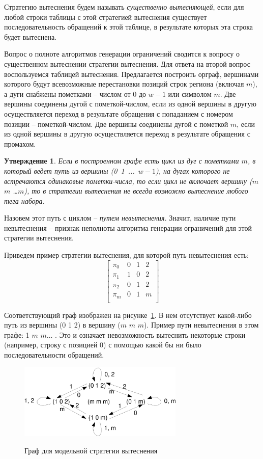 \documentclass[14pt]{extreport}
\newtheorem{utv}{Утверждение}
\begin{document}
Стратегию вытеснения будем называть \emph{существенно вытесняющей}, если для любой строки таблицы с этой стратегией вытеснения существует последовательность обращений к 
этой таблице, в результате которых эта строка будет вытеснена. 

Вопрос о полноте алгоритмов генерации ограничений сводится к вопросу о существенном вытеснении стратегии вытеснения. Для ответа на второй вопрос воспользуемся таблицей вытеснения. Предлагается построить орграф, вершинами которого будут всевозможные перестановки позиций строк региона (включая $m$), а дуги снабжены пометками -- числом от 0 до $w{-}1$ или символом
$m$. Две вершины соединены дугой с пометкой-числом, если из одной
вершины в другую осуществляется переход в результате обращения с попаданием с
номером позиции -- пометкой-числом. Две вершины соединены дугой с пометкой $m$,
если из одной вершины в другую осуществляется переход в результате обращения с промахом.

\begin{utv}
Если в построенном графе есть цикл из дуг с пометками $m$, в который
ведет путь из вершины (0~1~...~$w{-}1$), на дугах которого не
встречаются одинаковые пометки-числа, то если цикл не включает
вершину ($m$ $m$ \dots $m$), то в стратегии вытеснения не всегда
возможно вытеснение любого тега набора.
\end{utv}

Назовем этот путь с циклом -- \emph{путем невытеснения}. Значит, наличие
пути невытеснения -- признак неполноты алгоритма генерации ограничений для этой стратегии
вытеснения.

Приведем пример стратегии вытеснения, для которой путь невытеснения
есть:
$$\left[
  \begin{array}{c|cccc}
    \pi_0 & 0 & 1 & 2 \\
    \pi_1 & 1 & 0 & 2 \\
    \pi_2 & 0 & 1 & 2 \\
    \pi_m & 0 & 1 & m \\
  \end{array}
\right]
$$

Соответствующий граф изображен на рисунке~\ref{badpolicy}. В нем
отсутствует какой-либо путь из вершины (0 1 2) в вершину ($m$ $m$
$m$). Пример пути невытеснения в этом графе: 1 $m$ $m \dots$ . Это и
означает невозможность вытеснить некоторые строки (например, строку с позицией 0) с помощью какой бы ни было последовательности обращений.
\begin{figure}[h]\center
  \includegraphics[width=0.7\textwidth]{2.theor/badpolicy}\\
  \caption{Граф для модельной стратегии вытеснения}\label{badpolicy}
\end{figure}
\end{document}
